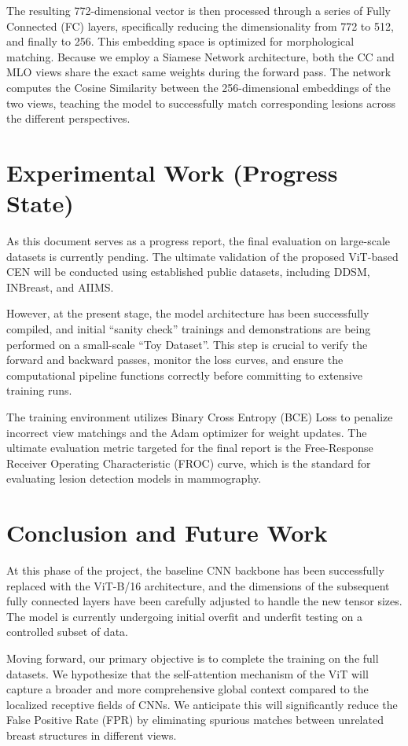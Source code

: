 \documentclass[conference]{IEEEtran}
\begin{document}
The resulting 772-dimensional vector is then processed through a series of Fully Connected (FC) layers, specifically reducing the dimensionality from 772 to 512, and finally to 256. This embedding space is optimized for morphological matching. Because we employ a Siamese Network architecture, both the CC and MLO views share the exact same weights during the forward pass. The network computes the Cosine Similarity between the 256-dimensional embeddings of the two views, teaching the model to successfully match corresponding lesions across the different perspectives.

\section{Experimental Work (Progress State)}
As this document serves as a progress report, the final evaluation on large-scale datasets is currently pending. The ultimate validation of the proposed ViT-based CEN will be conducted using established public datasets, including DDSM, INBreast, and AIIMS.

However, at the present stage, the model architecture has been successfully compiled, and initial ``sanity check'' trainings and demonstrations are being performed on a small-scale ``Toy Dataset''. This step is crucial to verify the forward and backward passes, monitor the loss curves, and ensure the computational pipeline functions correctly before committing to extensive training runs.

The training environment utilizes Binary Cross Entropy (BCE) Loss to penalize incorrect view matchings and the Adam optimizer for weight updates. The ultimate evaluation metric targeted for the final report is the Free-Response Receiver Operating Characteristic (FROC) curve, which is the standard for evaluating lesion detection models in mammography.

\section{Conclusion and Future Work}
At this phase of the project, the baseline CNN backbone has been successfully replaced with the ViT-B/16 architecture, and the dimensions of the subsequent fully connected layers have been carefully adjusted to handle the new tensor sizes. The model is currently undergoing initial overfit and underfit testing on a controlled subset of data.

Moving forward, our primary objective is to complete the training on the full datasets. We hypothesize that the self-attention mechanism of the ViT will capture a broader and more comprehensive global context compared to the localized receptive fields of CNNs. We anticipate this will significantly reduce the False Positive Rate (FPR) by eliminating spurious matches between unrelated breast structures in different views.
\end{document}
